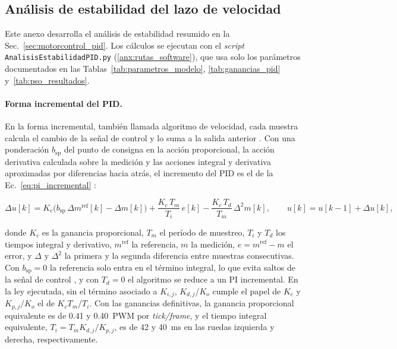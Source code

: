 \begin{appendices}
\subsection{Análisis de estabilidad del lazo de velocidad}
\label{anx:estabilidad_pid}

Este anexo desarrolla el análisis de estabilidad resumido en la
Sec.~\ref{sec:motorcontrol_pid}. Los cálculos se ejecutan con el \textit{script}
\texttt{AnalisisEstabilidadPID.py} (\ref{anx:rutas_software}), que usa solo los
parámetros documentados en las Tablas~\ref{tab:parametros_modelo},
\ref{tab:ganancias_pid} y~\ref{tab:pso_resultados}.

\paragraph{Forma incremental del PID.} En la forma incremental, también llamada
algoritmo de velocidad, cada muestra calcula el cambio de la señal de control y
lo suma a la salida anterior \citep[Sec.~13.4]{astrom2009controlpid}. Con una
ponderación $b_{\mathrm{sp}}$ del punto de consigna en la acción proporcional,
la acción derivativa calculada sobre la medición y las acciones integral y
derivativa aproximadas por diferencias hacia atrás, el incremento del PID es el
de la Ec.~\eqref{eq:pi_incremental}
\citep[Secs.~3.4, 13.3 y~13.4]{astrom2009controlpid}:

\begin{equation}
\Delta u[k]
=
K_c\bigl(b_{\mathrm{sp}}\,\Delta m^{\mathrm{ref}}[k]-\Delta m[k]\bigr)
+
\frac{K_c\,T_m}{T_i}\,e[k]
-
\frac{K_c\,T_d}{T_m}\,\Delta^{2} m[k],
\qquad
u[k]=u[k-1]+\Delta u[k],
\label{eq:pi_incremental}
\end{equation}

\noindent donde $K_c$ es la ganancia proporcional, $T_m$ el período de
muestreo, $T_i$ y $T_d$ los tiempos integral y derivativo, $m^{\mathrm{ref}}$ la
referencia, $m$ la medición, $e=m^{\mathrm{ref}}-m$ el error, y $\Delta$ y
$\Delta^{2}$ la primera y la segunda diferencia entre muestras consecutivas. Con
$b_{\mathrm{sp}}=0$ la referencia solo entra en el término integral, lo que
evita saltos de la señal de control \citep[Sec.~3.4]{astrom2009controlpid}, y
con $T_d=0$ el algoritmo se reduce a un PI incremental. En la ley ejecutada, sin
el término asociado a $K_{i,j}$, $K_{d,j}/K_o$ cumple el papel de $K_c$ y
$K_{p,j}/K_o$ el de $K_cT_m/T_i$. Con las ganancias definitivas, la ganancia
proporcional equivalente es de 0.41 y 0.40~PWM por \textit{tick/frame}, y el
tiempo integral equivalente, $T_i=T_mK_{d,j}/K_{p,j}$, es de 42 y 40~ms en las
ruedas izquierda y derecha, respectivamente.


\end{appendices}
